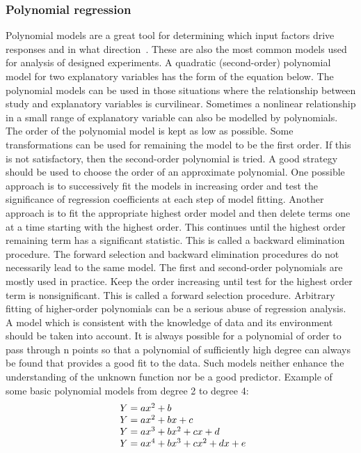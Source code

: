 \subsubsection{Polynomial regression} \label{sec:poly}
Polynomial models are a great tool for determining which input factors drive responses and in what direction~\cite{poly}.
These are also the most common models used for analysis of designed experiments.
A quadratic (second-order) polynomial model for two explanatory variables has the form of the equation below.
The polynomial models can be used in those situations where the relationship between study and explanatory variables is curvilinear.
Sometimes a nonlinear relationship in a small range of explanatory variable can also be modelled by polynomials.
The order of the polynomial model is kept as low as possible.
Some transformations can be used for remaining the model to be the first order.
If this is not satisfactory, then the second-order polynomial is tried.
A good strategy should be used to choose the order of an approximate polynomial.
One possible approach is to successively fit the models in increasing order and test the significance of regression coefficients at each step of model fitting.
Another approach is to fit the appropriate highest order model and then delete terms one at a time starting with the highest order.
This continues until the highest order remaining term has a significant statistic.
This is called a backward elimination procedure.
The forward selection and backward elimination procedures do not necessarily lead to the same model.
The first and second-order polynomials are mostly used in practice.
Keep the order increasing until test for the highest order term is nonsignificant.
This is called a forward selection procedure.
Arbitrary fitting of higher-order polynomials can be a serious abuse of regression analysis.
A model which is consistent with the knowledge of data and its environment should be taken into account.
It is always possible for a polynomial of order to pass through n points so that a polynomial of sufficiently high degree can always be found that provides a good fit to the data.
Such models neither enhance the understanding of the unknown function nor be a good predictor.
Example of some basic polynomial models from degree 2 to degree 4:\\
\begin{equation} \label{eq:poly}
\begin{array}{l@{}l}
	Y = ax^2 + b\\
	Y = ax^2 + bx + c\\
	Y = ax^3 + bx^2 + cx + d\\
	Y = ax^4 + bx^3 + cx^2 + dx + e\\
\end{array}
\end{equation}

